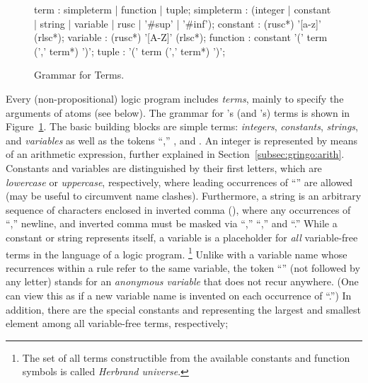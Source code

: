 \begin{figure}
\vspace*{-19mm}
\railnontermfont{\rmfamily\itshape}%
\begin{rail}
	term        : simpleterm | function | tuple;
	simpleterm  : (integer | constant | string | variable | rusc | '\#sup' | '\#inf');
	constant    : (rusc*) '[a-z]' (rlsc*);
	variable    : (rusc*) '[A-Z]' (rlsc*);
	function    : constant '(' term (',' term*) ')';
	tuple       :          '(' term (',' term*) ')';
\end{rail}
\caption{Grammar for Terms.\label{fig:terms}}
\end{figure}

Every (non-propositional) logic program includes \emph{terms},
mainly to specify the arguments of atoms (see below).
The grammar for \gringo's (and \clingo's) terms is shown in Figure~\ref{fig:terms}.
The basic building blocks are simple terms:
\emph{integers}, \emph{constants}, \emph{strings}, and \emph{variables}
as well as the tokens ``,'' , and .
An integer is represented by means of an arithmetic expression,
further explained in Section~\ref{subsec:gringo:arith}.
Constants and variables are distinguished by their first letters, 
which are \emph{lowercase} or \emph{uppercase}, respectively,
where leading occurrences of ``'' are allowed
(may be useful to circumvent name clashes).
Furthermore, a string is an arbitrary sequence of characters
enclosed in inverted comma (),
where any occurrences of ``\code{\textbackslash},'' newline, and inverted comma
must be masked via ``\code{\textbackslash\textbackslash},'' ``,''
and ``.''
While a constant or string represents itself,
a variable is a placeholder for \emph{all} variable-free terms
in the language of a logic program.%
\footnote{The set of all terms constructible from the available
          constants and function symbols is called \emph{Herbrand universe}.}
Unlike with a variable name whose recurrences within a rule refer to the same variable,
the token ``'' (not followed by any letter)
stands for an \emph{anonymous variable} that does not recur anywhere. 
(One can view this as if a new variable name is invented on each
 occurrence of ``.'')
In addition, there are the special constants  and 
representing the largest and smallest element among all variable-free terms, respectively;
